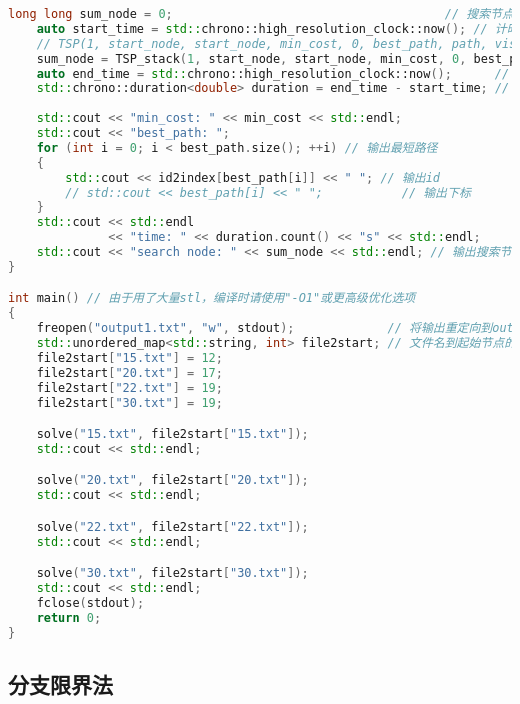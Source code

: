 \documentclass[lang=cn,11pt,a4paper]{elegantpaper}
\begin{document}
\begin{lstlisting}[language=c++]
    long long sum_node = 0;                                      // 搜索节点数，初始化为0，longlong防止溢出
    auto start_time = std::chrono::high_resolution_clock::now(); // 计时开始
    // TSP(1, start_node, start_node, min_cost, 0, best_path, path, vis, graph, sum_node);
    sum_node = TSP_stack(1, start_node, start_node, min_cost, 0, best_path, path, vis, graph);
    auto end_time = std::chrono::high_resolution_clock::now();      // 计时结束
    std::chrono::duration<double> duration = end_time - start_time; // 计算耗时
    
    std::cout << "min_cost: " << min_cost << std::endl;
    std::cout << "best_path: ";
    for (int i = 0; i < best_path.size(); ++i) // 输出最短路径
    {
        std::cout << id2index[best_path[i]] << " "; // 输出id
        // std::cout << best_path[i] << " ";           // 输出下标
    }
    std::cout << std::endl
              << "time: " << duration.count() << "s" << std::endl;
    std::cout << "search node: " << sum_node << std::endl; // 输出搜索节点数
}

int main() // 由于用了大量stl，编译时请使用"-O1"或更高级优化选项
{
    freopen("output1.txt", "w", stdout);             // 将输出重定向到output.txt
    std::unordered_map<std::string, int> file2start; // 文件名到起始节点的映射
    file2start["15.txt"] = 12;
    file2start["20.txt"] = 17;
    file2start["22.txt"] = 19;
    file2start["30.txt"] = 19;

    solve("15.txt", file2start["15.txt"]);
    std::cout << std::endl;

    solve("20.txt", file2start["20.txt"]);
    std::cout << std::endl;

    solve("22.txt", file2start["22.txt"]);
    std::cout << std::endl;

    solve("30.txt", file2start["30.txt"]);
    std::cout << std::endl;
    fclose(stdout);
    return 0;
}
\end{lstlisting}

\subsection{分支限界法}
\end{document}
